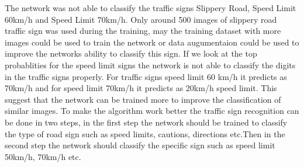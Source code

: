 \documentclass[11pt]{article}
\begin{document}
The network was not able to classify the traffic signs Slippery Road,
Speed Limit 60km/h and Speed Limit 70km/h. Only around 500 images of
slippery road traffic sign was used during the training, may the
training dataset with more images could be used to train the network or
data augumentaion could be used to improve the networks ability to
classify this sign. If we look at the top probablities for the speed
limit signs the network is not able to classify the digits in the
traffic signs properly. For traffic signs speed limit 60 km/h it
predicts as 70km/h and for speed limit 70km/h it predicts as 20km/h
speed limit. This suggest that the network can be trained more to
improve the classification of similar images. To make the algorithm work
better the traffic sign recognition can be done in two steps, in the
first step the network should be trained to classify the type of road
sign such as speed limits, cautions, directions etc.Then in the second
step the network should classify the specific sign such as speed limit
50km/h, 70km/h etc.


    
    
    
    
\end{document}
